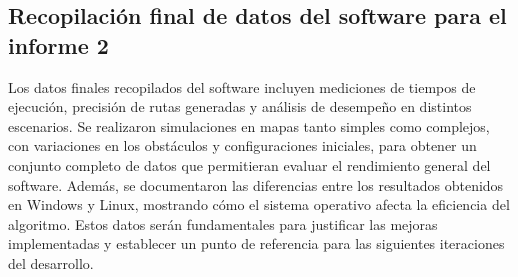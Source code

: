 \subsection{Recopilaci\'on final de datos del software para el informe 2}
    Los datos finales recopilados del software incluyen
        mediciones de tiempos de ejecuci\'on, precisi\'on de rutas
        generadas y an\'alisis de desempe\~no en distintos escenarios.
        \vskip 0.5cm
        Se realizaron simulaciones en mapas tanto simples como
        complejos, con variaciones en los obst\'aculos y
        configuraciones iniciales, para obtener un conjunto completo
        de datos que permitieran evaluar el rendimiento general del
        software.
    \vskip 0.5cm
    Adem\'as, se documentaron las diferencias entre los
        resultados obtenidos en Windows y Linux, mostrando c\'omo
        el sistema operativo afecta la eficiencia del algoritmo. Estos
        datos ser\'an fundamentales para justificar las mejoras
        implementadas y establecer un punto de referencia para las
        siguientes iteraciones del desarrollo.
    \vskip 0.5cm